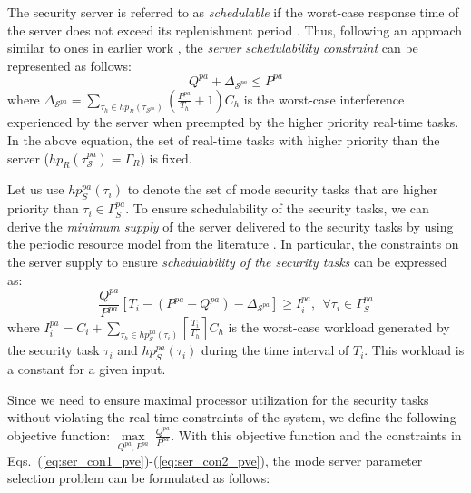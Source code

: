 \documentclass[../rt_server_main.tex]{subfiles}
\begin{document}
The security server is referred to as \textit{schedulable} if the worst-case response time of the server does not exceed its replenishment period \cite{server_ab_uk}. Thus, following an approach similar to ones in  earlier work \cite{mhasan_rtss16, mn_gp},  the \textit{server schedulability constraint} can be represented as follows: 
 \begin{equation} \label{eq:ser_con1_pve}
 Q^{pa} + \Delta_{\mathcal{S}^{pa}} \leq P^{pa}
 \end{equation}
 where $\Delta_{\mathcal{S}^{pa}} = \sum\limits_{\tau_h \in hp_R(\tau_{\mathcal{S}^{pa}})} \left( \frac{P^{pa}}{T_h} + 1 \right)  C_h$ is the worst-case interference experienced by the server when preempted by the higher priority real-time tasks.
In the above equation, the set of real-time tasks with higher priority than the server (\ie $hp_R(\tau_\mathcal{S}^{pa}) = \Gamma_R$) is fixed.

Let us use $hp_S^{pa}(\tau_i)$ to denote the set of \pve mode security tasks that are higher priority than $\tau_i \in \Gamma_S^{pa}$. To ensure schedulability of the security tasks, we can derive the \textit{minimum supply} of the server delivered to the security tasks by using the periodic resource model from the literature  \cite{periodic_server_qp, mn_gp, mhasan_rtss16}. In particular, the constraints on the server supply to ensure \textit{schedulability of the security tasks} \cite{mhasan_rtss16} can be expressed as:
\begin{equation} \label{eq:ser_con2_pve}
 \frac{Q^{pa}}{P^{pa}} \left[ T_i - (P^{pa} - Q^{pa}) - \Delta_{\mathcal{S}^{pa}}  \right] \geq I_i^{pa}, ~~\forall \tau_i \in \Gamma_S^{pa} 
\end{equation}
where $I_i^{pa} = C_i + \sum\limits_{\tau_h \in hp_S^{pa}(\tau_i)} \left\lceil \frac{T_i}{T_h} \right\rceil C_h$ is the worst-case workload generated by the security task $\tau_i$ and $hp_S^{pa}(\tau_i)$ during the time interval of $T_i$. This workload is a constant for a given input. 

Since we need to ensure maximal processor utilization for the security tasks without violating the real-time constraints of the system, we define the following objective function:
$\underset{Q^{pa}, P^{pa}}{\operatorname{max}}~ \frac{Q^{pa}}{P^{pa}}$. 
With 
this objective function
and the constraints in Eqs.~(\ref{eq:ser_con1_pve})-(\ref{eq:ser_con2_pve}), the \pve mode server parameter selection problem can be formulated as follows:
\end{document}
